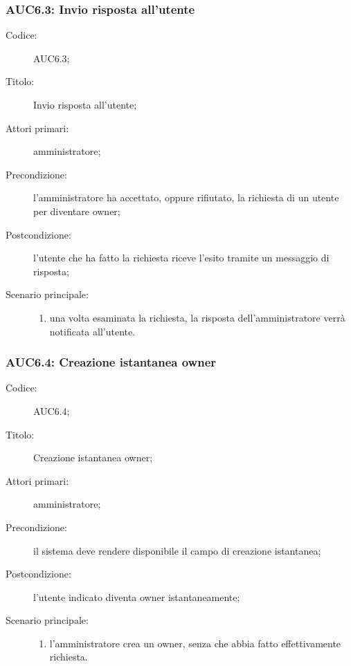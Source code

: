 \documentclass[../../../analisi-dei-requisiti.tex]{subfiles}
\begin{document}
\subsubsection{AUC6.3: Invio risposta all'utente}%
\label{subs:AUC6.3}

\begin{description}
  \item[Codice:] AUC6.3;
  \item[Titolo:] Invio risposta all'utente;
  \item[Attori primari:] amministratore;
  \item[Precondizione:] l'amministratore ha accettato, oppure rifiutato, la richiesta di un utente per diventare owner;
  \item[Postcondizione:] l'utente che ha fatto la richiesta riceve l'esito tramite un messaggio di risposta;
  \item[Scenario principale:]
  \begin{enumerate}
    \item una volta esaminata la richiesta, la risposta dell'amministratore verrà notificata all'utente.
  \end{enumerate}
\end{description}


\subsubsection{AUC6.4: Creazione istantanea owner}%
\label{subs:AUC6.4}

\begin{description}
  \item[Codice:] AUC6.4;
  \item[Titolo:] Creazione istantanea owner;
  \item[Attori primari:] amministratore;
  \item[Precondizione:] il sistema deve rendere disponibile il campo di creazione istantanea;
  \item[Postcondizione:] l'utente indicato diventa owner istantaneamente;
  \item[Scenario principale:]
  \begin{enumerate}
    \item l'amministratore crea un owner, senza che abbia fatto effettivamente richiesta.
  \end{enumerate}
\end{description}
\end{document}
